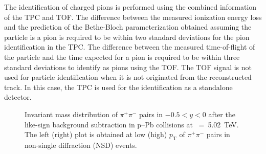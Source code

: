 The identification of charged pions is performed using the combined information of the TPC and TOF. The difference between the measured ionization energy loss and the prediction of the Bethe-Bloch parameterization obtained assuming the particle is a pion is required to be within two standard deviations for the pion identification in the TPC. The difference between the measured time-of-flight of the particle and the time expected for a pion is required to be within three standard deviations to identify as pions using the TOF. The TOF signal is not used for particle identification when it is not originated from the reconstructed track. In this case, the TPC is used for the identification as a standalone detector.

\label{sec:ana}
\begin{figure}[hbt!]
	\centering
	\caption{ Invariant mass distribution of $\pi^{+}\pi^{-}$ pairs in $-0.5<y<0$ after the like-sign background subtraction in p--Pb collisions at \snn~=~5.02~TeV. The left (right) plot is obtained at low (high) $p_{\mathrm{T}}$ of $\pi^{+}\pi^{-}$ pairs in non-single diffraction (NSD) events. }
	\label{fig:SigExt}
\end{figure}

